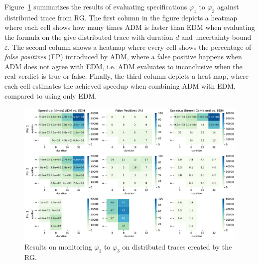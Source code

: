 Figure~\ref{fig:rgresults} summarizes the results of evaluating specifications $\varphi_1$ to $\varphi_3$ against distributed trace from RG. The first column in the figure depicts a heatmap where each cell shows how many times ADM is faster than EDM when evaluating the formula on the give distributed trace with duration $d$ and uncertainty bound $\varepsilon$. The second column shows a heatmap where every cell shows the percentage of \emph{false positives} (FP) introduced by ADM, where a false positive happens when ADM does not agree with EDM, i.e. ADM evaluates to inconclusive when the real verdict is true or false. Finally, the third column depicts a heat map, where each cell estimates the achieved speedup when combining ADM with EDM, compared to using only EDM.

\begin{figure}[t]
	\begin{center}
	\includegraphics[width=\linewidth]{speedup}
\caption{Results on monitoring $\varphi_{1}$ to $\varphi_{3}$ on distributed traces created by the RG.}
\label{fig:rgresults}
\end{center}
\vspace{1em}
\end{figure}

